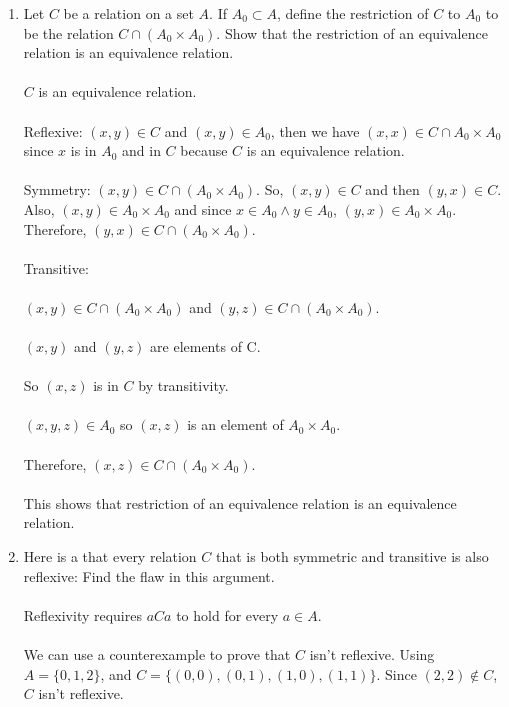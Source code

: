 \documentclass[]{article}
\begin{document}
\begin{enumerate}
    \item Let $C$ be a relation on a set $A$. If $A_0 \subset A$, define the restriction of $C$ to $A_0$ to be the relation $C \cap (A_0 \times A_0)$. Show that the restriction of an equivalence relation is an equivalence relation.
    \\\\ $C$ is an equivalence relation. 
    \\\\ Reflexive: $(x,y) \in C$ and $(x,y) \in A_0$, then we have $(x,x) \in C \cap A_0 \times A_0$ since $x$ is in $A_0$ and in $C$ because $C$ is an equivalence relation.
    \\\\ Symmetry: $(x,y) \in C \cap (A_0 \times A_0)$. So, $(x,y) \in C$ and then $(y,x) \in C$. Also, $(x,y) \in A_0 \times A_0$ and since $x \in A_0 \land y \in A_0$, $(y,x) \in A_0 \times A_0$. Therefore, $(y,x) \in C \cap (A_0 \times A_0)$.
    \\\\ Transitive: 
    \\\\$(x,y) \in C \cap (A_0 \times A_0)$ and $(y,z) \in C \cap (A_0 \times A_0)$.
    \\\\$(x,y)$ and $(y,z)$ are elements of C.
    \\\\So $(x,z)$ is in $C$ by transitivity.
    \\\\$(x,y,z) \in A_0$ so $(x,z)$ is an element of $A_0 \times A_0$.
    \\\\Therefore, $(x,z) \in C \cap (A_0 \times A_0)$.
    \\\\ This shows that restriction of an equivalence relation is an equivalence relation.
    
    \item Here is a  that every relation $C$ that is both symmetric and transitive is also reflexive:  Find the flaw in this argument.
    \\\\ Reflexivity requires $aCa$ to hold for every $a \in A$.
    \\\\We can use a counterexample to prove that $C$ isn't reflexive. Using $A=\{0,1,2\}$, and $C=\{(0,0),(0,1),(1,0),(1,1)\}$. Since $(2,2) \notin C$, $C$ isn't reflexive.
    

\end{enumerate}
\end{document}
